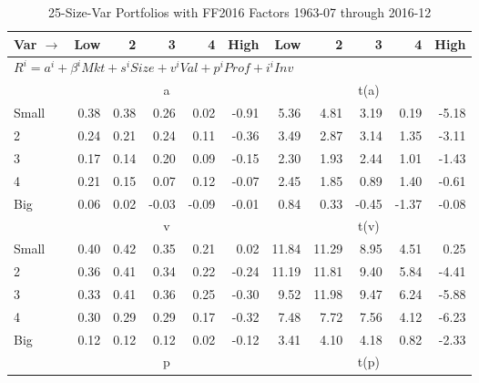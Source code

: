 
\begin{table}[!ht]
\footnotesize
\centering
\caption{25-Size-Var Portfolios with FF2016 Factors 1963-07 through 2016-12}
\begin{tabular}{lrrrrrrrrrr}
  \toprule
    Var $\rightarrow$ & Low & 2 & 3 & 4 & High & Low & 2 & 3 & 4 & High \\ 
  \midrule
  \multicolumn{11}{l}{$R^i=a^i+\beta^iMkt+s^iSize+v^iVal+p^iProf+i^iInv$} \\

  
    
      & \multicolumn{5}{c}{a} & \multicolumn{5}{c}{t(a)}
    
    \\
      \cmidrule(r){2-6} \cmidrule(r){7-11}

    Small   & 0.38  & 0.38  & 0.26  & 0.02  & -0.91  & 5.36  & 4.81  & 3.19  & 0.19  & -5.18  \\
         2  & 0.24  & 0.21  & 0.24  & 0.11  & -0.36  & 3.49  & 2.87  & 3.14  & 1.35  & -3.11  \\
         3  & 0.17  & 0.14  & 0.20  & 0.09  & -0.15  & 2.30  & 1.93  & 2.44  & 1.01  & -1.43  \\
         4  & 0.21  & 0.15  & 0.07  & 0.12  & -0.07  & 2.45  & 1.85  & 0.89  & 1.40  & -0.61  \\
    Big     & 0.06  & 0.02  & -0.03  & -0.09  & -0.01  & 0.84  & 0.33  & -0.45  & -1.37  & -0.08  \\

  
    
      & \multicolumn{5}{c}{v} & \multicolumn{5}{c}{t(v)}
    
    \\
      \cmidrule(r){2-6} \cmidrule(r){7-11}

    Small   & 0.40  & 0.42  & 0.35  & 0.21  & 0.02  & 11.84  & 11.29  & 8.95  & 4.51  & 0.25  \\
         2  & 0.36  & 0.41  & 0.34  & 0.22  & -0.24  & 11.19  & 11.81  & 9.40  & 5.84  & -4.41  \\
         3  & 0.33  & 0.41  & 0.36  & 0.25  & -0.30  & 9.52  & 11.98  & 9.47  & 6.24  & -5.88  \\
         4  & 0.30  & 0.29  & 0.29  & 0.17  & -0.32  & 7.48  & 7.72  & 7.56  & 4.12  & -6.23  \\
    Big     & 0.12  & 0.12  & 0.12  & 0.02  & -0.12  & 3.41  & 4.10  & 4.18  & 0.82  & -2.33  \\

  
    
      & \multicolumn{5}{c}{p} & \multicolumn{5}{c}{t(p)}
    

\end{tabular}
\end{table}
